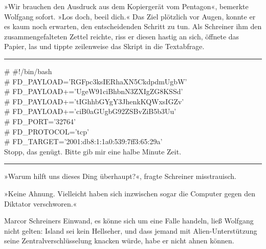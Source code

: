 »Wir brauchen den Ausdruck aus dem Kopiergerät vom Pentagon«, bemerkte Wolfgang sofort. »Los doch, beeil dich.« Das Ziel plötzlich vor Augen, konnte er es kaum noch erwarten, den entscheidenden Schritt zu tun. Als Schreiner ihm den zusammengefalteten Zettel reichte, riss er diesen hastig an sich, öffnete das Papier, las und tippte zeilenweise das Skript in die Textabfrage.

\noindent \parbox{\textwidth}{ \vspace{3ex} \hrule \vspace{3ex}

    \begin{footnotesize}
    \begin{ttfamily}

\noindent \# \#!/bin/bash\\
\noindent \# FD\_PAYLOAD='RGFpc3ksIERhaXN5CkdpdmUgbW'\\
\noindent \# FD\_PAYLOAD+='UgeW91ciBhbnN3ZXIgZG8KSSd'\\
\noindent \# FD\_PAYLOAD+='tIGhhbGYgY3JhenkKQWxsIGZv'\\
\noindent \# FD\_PAYLOAD+='ciB0aGUgbG92ZSBvZiB5b3Uu'\\
\noindent \# FD\_PORT='32764'\\
\noindent \# FD\_PROTOCOL='tcp'\\
\noindent \# FD\_TARGET='2001:db8:1:1a0:539:7ff3:65:29a'\\
\noindent Stopp, das genügt. Bitte gib mir eine halbe Minute Zeit.

    \end{ttfamily}
    \end{footnotesize}

\vspace{3ex} \hrule \vspace{3ex} }

»Warum hilft uns dieses Ding überhaupt?«, fragte Schreiner misstrauisch.

»Keine Ahnung. Vielleicht haben sich inzwischen sogar die Computer gegen den Diktator verschworen.«

Marcor Schreiners Einwand, es könne sich um eine Falle handeln, ließ Wolfgang nicht gelten: Island sei kein Hellseher, und dass jemand mit Alien-Unterstützung seine Zentralverschlüsselung knacken würde, habe er nicht ahnen können.

